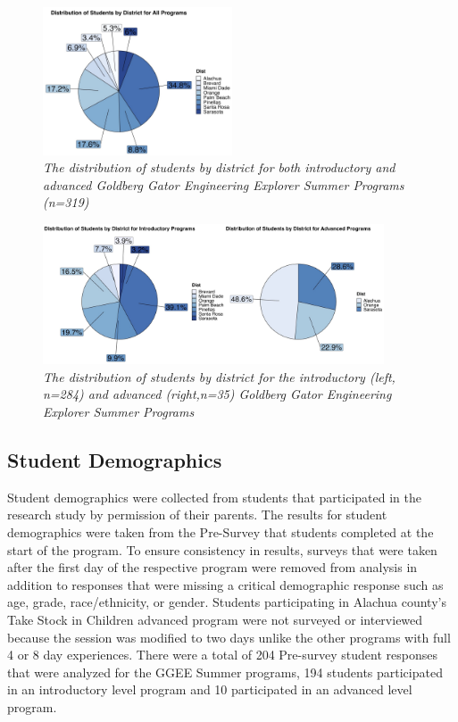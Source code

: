 \documentclass[
]{article}
\begin{document}
\begin{figure}
\centering
\includegraphics[width=0.5\textwidth,height=\textheight]{Graphs/Report/GGEE_23_District_All.jpg}
\caption{\emph{The distribution of students by district for both
introductory and advanced Goldberg Gator Engineering Explorer Summer
Programs (n=319)}}
\end{figure}

\begin{figure}
\centering
\includegraphics[width=0.9\textwidth,height=\textheight]{Graphs/Report/GGEE_23_District_IA.jpg}
\caption{\emph{The distribution of students by district for the
introductory (left, n=284) and advanced (right,n=35) Goldberg Gator
Engineering Explorer Summer Programs}}
\end{figure}

\hypertarget{student-demographics}{%
\subsection{Student Demographics}\label{student-demographics}}

Student demographics were collected from students that participated in
the research study by permission of their parents. The results for
student demographics were taken from the Pre-Survey that students
completed at the start of the program. To ensure consistency in results,
surveys that were taken after the first day of the respective program
were removed from analysis in addition to responses that were missing a
critical demographic response such as age, grade, race/ethnicity, or
gender. Students participating in Alachua county's Take Stock in
Children advanced program were not surveyed or interviewed because the
session was modified to two days unlike the other programs with full 4
or 8 day experiences. There were a total of 204 Pre-survey student
responses that were analyzed for the GGEE Summer programs, 194 students
participated in an introductory level program and 10 participated in an
advanced level program.
\end{document}
